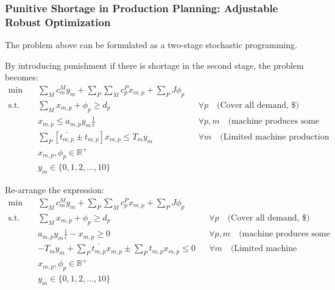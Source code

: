 \documentclass[fleqn,10pt]{wlscirep}
\begin{document}
\subsubsection{Punitive Shortage in Production Planning: Adjustable Robust Optimization}

The problem above can be formulated as a two-stage stochastic programming.

By introducing punishment if there is shortage in the second stage, the problem becomes:
\begin{align}
    \min \quad & \sum_{M} c^{M}_{m} y_{m} + \sum_{P} \sum_{M} c^{P}_{p} x_{m, p} + \sum_{P} J \phi_{p} \\
    \text{s.t.} \quad & \sum_{M} x_{m, p} + \phi_{p} \geq d_{p} && \forall p \quad \text{(Cover all demand, \$)} \\
    & x_{m, p} \leq a_{m, p} y_{m} \frac{1}{\epsilon} && \forall p, m \quad \text{(machine produces some products)} \\
    & \sum_{P} \left[\overline{t_{m, p}} \pm t_{m, p} \right] x_{m, p} \leq T_{m} y_{m} && \forall m \quad \text{(Limited machine production time, hour)} \\
    & x_{m, p}, \phi_{p} \in \mathbb{R}^+ \\
    & y_{m} \in \{0, 1, 2, ..., 10\}
\end{align}

Re-arrange the expression:
\begin{align}
    \min \quad & \sum_{M} c^{M}_{m} y_{m} + \sum_{P} \sum_{M} c^{P}_{p} x_{m, p} + \sum_{P} J \phi_{p} \\
    \text{s.t.} \quad & \sum_{M} x_{m, p} + \phi_{p} \geq d_{p} && \forall p \quad \text{(Cover all demand, \$)} \\
    & a_{m, p} y_{m} \frac{1}{\epsilon} - x_{m, p} \geq 0 && \forall p, m \quad \text{(machine produces some products)} \\
    & - T_{m} y_{m} + \sum_{P} \overline{t_{m, p}} x_{m, p} \pm \sum_{P} t_{m, p} x_{m, p} \leq 0 && \forall m \quad \text{(Limited machine production time, hour)} \\
    & x_{m, p}, \phi_{p} \in \mathbb{R}^+ \\
    & y_{m} \in \{0, 1, 2, ..., 10\}
\end{align}
\end{document}
